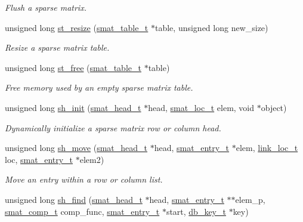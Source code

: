 \begin{CompactItemize}
\begin{CompactList}\small\item\em Flush a sparse matrix. \item\end{CompactList}\item 
unsigned long \hyperlink{group__dbprim__smat_ga18}{st\_\-resize} (\hyperlink{struct__smat__table__s}{smat\_\-table\_\-t} $\ast$table, unsigned long new\_\-size)
\begin{CompactList}\small\item\em Resize a sparse matrix table. \item\end{CompactList}\item 
unsigned long \hyperlink{group__dbprim__smat_ga19}{st\_\-free} (\hyperlink{struct__smat__table__s}{smat\_\-table\_\-t} $\ast$table)
\begin{CompactList}\small\item\em Free memory used by an empty sparse matrix table. \item\end{CompactList}\item 
unsigned long \hyperlink{group__dbprim__smat_ga20}{sh\_\-init} (\hyperlink{struct__smat__head__s}{smat\_\-head\_\-t} $\ast$head, \hyperlink{group__dbprim__smat_ga6}{smat\_\-loc\_\-t} elem, void $\ast$object)
\begin{CompactList}\small\item\em Dynamically initialize a sparse matrix row or column head. \item\end{CompactList}\item 
unsigned long \hyperlink{group__dbprim__smat_ga21}{sh\_\-move} (\hyperlink{struct__smat__head__s}{smat\_\-head\_\-t} $\ast$head, \hyperlink{struct__smat__entry__s}{smat\_\-entry\_\-t} $\ast$elem, \hyperlink{group__dbprim__link_ga4}{link\_\-loc\_\-t} loc, \hyperlink{struct__smat__entry__s}{smat\_\-entry\_\-t} $\ast$elem2)
\begin{CompactList}\small\item\em Move an entry within a row or column list. \item\end{CompactList}\item 
unsigned long \hyperlink{group__dbprim__smat_ga22}{sh\_\-find} (\hyperlink{struct__smat__head__s}{smat\_\-head\_\-t} $\ast$head, \hyperlink{struct__smat__entry__s}{smat\_\-entry\_\-t} $\ast$$\ast$elem\_\-p, \hyperlink{group__dbprim__smat_ga5}{smat\_\-comp\_\-t} comp\_\-func, \hyperlink{struct__smat__entry__s}{smat\_\-entry\_\-t} $\ast$start, \hyperlink{struct__db__key__s}{db\_\-key\_\-t} $\ast$key)
$$
\end{CompactItemize}
